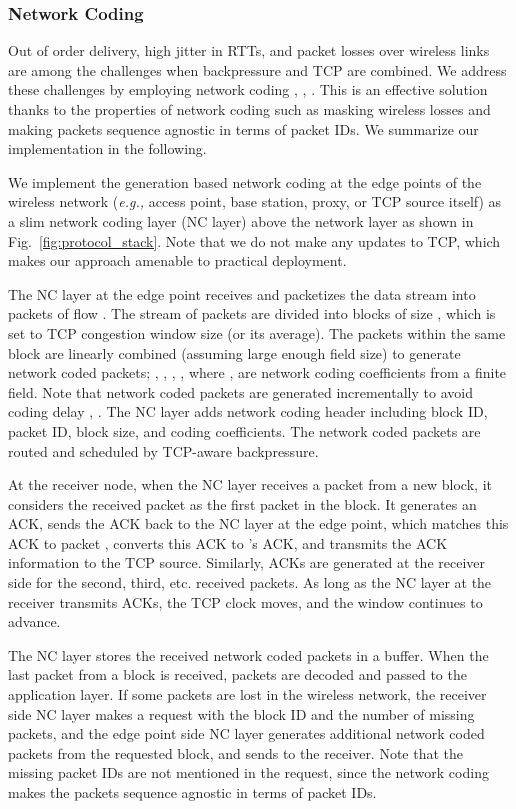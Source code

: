 \documentclass[conference]{IEEEtran}
\newcommand{\eg}{{\em e.g., }}
\begin{document}
\subsubsection{Network Coding}
Out of order delivery, high jitter in RTTs, and packet losses over wireless links are among the challenges when backpressure and TCP are combined. We address these challenges by employing network coding \cite{NC_meets_TCP}, \cite{multipath_tcp_toledo}, \cite{i2nc}. This is an effective solution thanks to the properties of network coding such as masking wireless losses and making packets sequence agnostic in terms of packet IDs. We summarize our implementation in the following.

We implement the generation based network coding \cite{practical_NC} at the edge points of the wireless network (\eg access point, base station, proxy, or TCP source itself) as a slim network coding layer (NC layer) above the network layer as shown in Fig.~\ref{fig:protocol_stack}. Note that we do not make any updates to TCP, which makes our approach amenable to practical deployment.

The NC layer at the edge point receives and packetizes the data stream into packets   of flow . The stream of packets are divided into blocks of size , which is set to TCP congestion window size (or its average). The packets within the same block are linearly combined (assuming large enough field size) to generate  network coded packets; , , , , where ,  are network coding coefficients from a finite field. Note that network coded packets are generated incrementally to avoid coding delay \cite{practical_NC}, \cite{i2nc}. The NC layer adds network coding header including block ID, packet ID, block size, and coding coefficients. The network coded packets are routed and scheduled by TCP-aware backpressure.

At the receiver node, when the NC layer receives a packet from a new block, it considers the received packet as the first packet in the block. It generates an ACK, sends the ACK back to the NC layer at the edge point, which matches this ACK to packet , converts this ACK to 's ACK, and transmits the ACK information to the TCP source. Similarly, ACKs are generated at the receiver side for the second, third, etc. received packets. As long as the NC layer at the receiver transmits ACKs, the TCP clock moves, and the window continues to advance.


The NC layer stores the received network coded packets in a buffer. When the last packet from a block is received, packets are decoded and passed to the application layer. If some packets are lost in the wireless network, the receiver side NC layer makes a request with the block ID and the number of missing packets, and the edge point side NC layer generates additional network coded packets from the requested block, and sends to the receiver. Note that the missing packet IDs are not mentioned in the request, since the network coding makes the packets sequence agnostic in terms of packet IDs.
\end{document}
